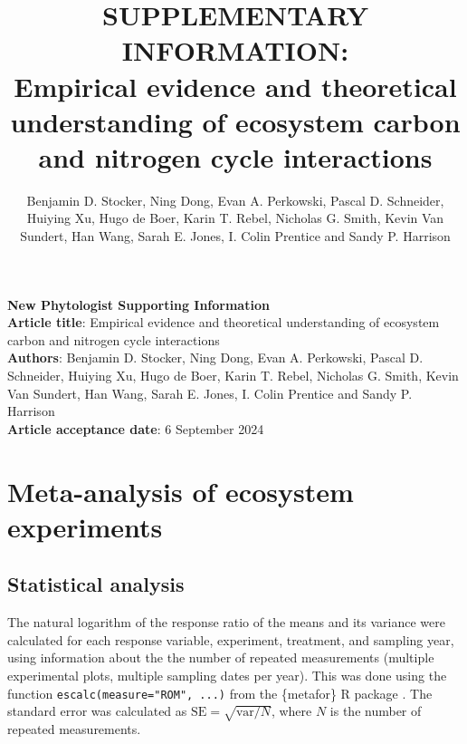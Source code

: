 \documentclass{myreport}
\begin{document}
\pagestyle{headings}

\renewcommand{\thefigure}{\arabic{figure}}
\renewcommand{\thetable}{\arabic{table}}
\renewcommand{\thesection}{Notes S\arabic{section}}
\renewcommand{\theequation}{\arabic{equation}}

\setcounter{section}{1}

% 

\title{SUPPLEMENTARY INFORMATION:\\
Empirical evidence and theoretical understanding of ecosystem carbon and nitrogen cycle interactions}
\author{Benjamin D. Stocker, Ning Dong, Evan A. Perkowski, Pascal D. Schneider,
Huiying Xu, Hugo de Boer, Karin T. Rebel, Nicholas G. Smith, Kevin Van Sundert, Han Wang, Sarah E. Jones, I. Colin Prentice and Sandy P. Harrison} 


{\selectfont
\noindent \textbf{New Phytologist Supporting Information} \\
\textbf{Article title}: Empirical evidence and theoretical understanding of ecosystem carbon and nitrogen cycle interactions\\
\textbf{Authors}: Benjamin D. Stocker, Ning Dong, Evan A. Perkowski, Pascal D. Schneider,
Huiying Xu, Hugo de Boer, Karin T. Rebel, Nicholas G. Smith, Kevin Van Sundert, Han Wang, Sarah E. Jones, I. Colin Prentice and Sandy P. Harrison\\
\textbf{Article acceptance date}: 6 September 2024 \\
}

\section{Meta-analysis of ecosystem experiments}

\subsection{Statistical analysis}
\label{sec:statisticalanalysis}

The natural logarithm of the response ratio of the means and its variance were calculated for each response variable, experiment, treatment, and sampling year, using information about the the number of repeated measurements (multiple experimental plots, multiple sampling dates per year). This was done using the function \texttt{escalc(measure="ROM", ...)} from the \{metafor\} R package \citep{viechtbauer_conducting_2010}. The standard error was calculated as $\text{SE} = \sqrt{\text{var}/N}$, where $N$ is the number of repeated measurements.
\end{document}

